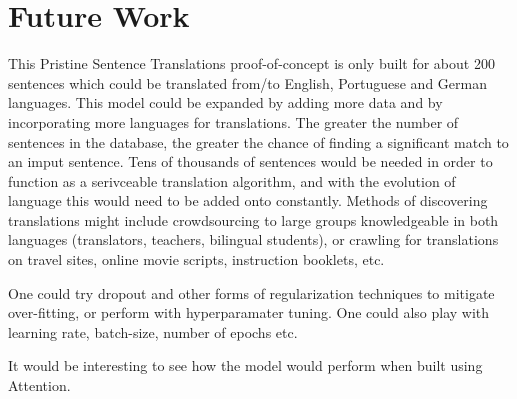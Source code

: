 \documentclass[runningheads]{llncs}
\begin{document}
	\section{Future Work}
	This Pristine Sentence Translations proof-of-concept is only built for about 200 sentences which could be translated from/to English, Portuguese and German languages. This model could be expanded by adding more data and by incorporating more languages for translations. The greater the number of sentences in the database, the greater the chance of finding a significant match to an imput sentence. Tens of thousands of sentences would be needed in order to function as a serivceable translation algorithm, and with the evolution of language this would need to be added onto constantly. Methods of discovering translations might include crowdsourcing to large groups knowledgeable in both languages (translators, teachers, bilingual students), or crawling for translations on travel sites, online movie scripts, instruction booklets, etc.
	
	One could try dropout and other forms of regularization techniques to mitigate over-fitting, or perform with hyperparamater tuning. One could also play with learning rate, batch-size, number of epochs etc.
	
	It would be interesting to see how the model would perform when built using Attention.
	
\end{document}
